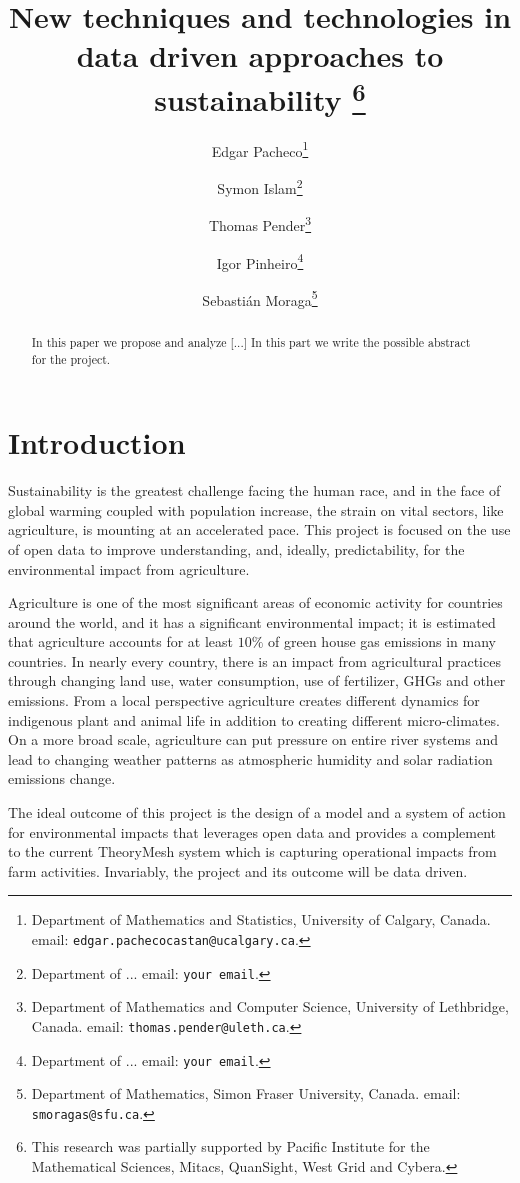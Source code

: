 \documentclass[11pt]{article}
\title{New techniques and technologies in data driven approaches to sustainability
\thanks{This research was 
partially supported by  Pacific Institute for the Mathematical Sciences, Mitacs, QuanSight, West Grid and Cybera.}}
\author{{\sc Edgar Pacheco}\thanks{Department of Mathematics and Statistics, University of Calgary, Canada.
email: {\tt edgar.pachecocastan@ucalgary.ca}.}
\and
{\sc Symon Islam}\thanks{Department of ...
email: {\tt your email}.}
\and
{\sc Thomas Pender}\thanks{Department of Mathematics and Computer Science, University of Lethbridge, Canada.
email: {\tt thomas.pender@uleth.ca}.}
\and
{\sc Igor Pinheiro}\thanks{Department of ...
email: {\tt your email}.}
\and
{\sc Sebasti\'an Moraga}\thanks{ Department of Mathematics, Simon Fraser University, Canada.
email: {\tt smoragas@sfu.ca}.}}
\date{}
\numberwithin{equation}{section}
\begin{document}
\maketitle

\begin{abstract}
\noindent
In this paper we propose and analyze [...] In this part we write the possible abstract for the project.

\end{abstract}

\smallskip\noindent

                                                  

\section{Introduction}\label{introduction}

Sustainability is the greatest challenge facing the human race, and in the face of global warming coupled with population increase, the strain on vital sectors, like agriculture, is mounting at an accelerated pace. This project is focused on the use of open data to improve understanding, and, ideally, predictability, for the environmental impact from agriculture. 

Agriculture is one of the most significant areas of economic activity for countries around the world, and it has a significant environmental impact; it is estimated that agriculture accounts for at least $10\%$ of green house gas emissions in many countries. In nearly every country, there is an impact from agricultural practices through changing land use, water consumption, use of fertilizer, GHGs and other emissions. From a local perspective agriculture creates different dynamics for indigenous plant and animal life in addition to creating different micro-climates. On a more broad scale, agriculture can put pressure on entire river systems and lead to changing weather patterns as atmospheric humidity and solar radiation emissions change.

The ideal outcome of this project is the design of a model and a system of action for environmental impacts that leverages open data and provides a complement to the current TheoryMesh system which is capturing operational impacts from farm activities. Invariably, the project and its outcome will be data driven.
\end{document}
